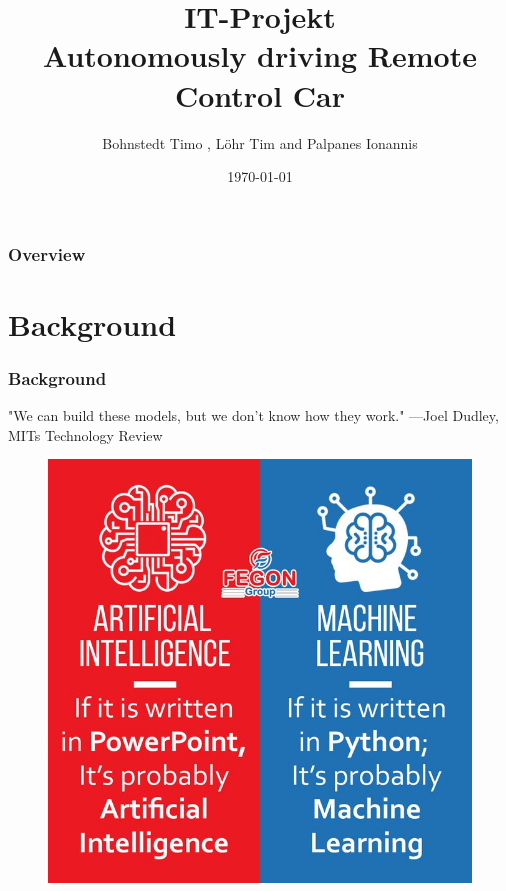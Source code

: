\documentclass{beamer}
\title{IT-Projekt \\ Autonomously driving Remote Control Car} %
\author{Bohnstedt Timo ,
      L\"ohr Tim and Palpanes Ionannis\\%
      }
\institute[Computer Science| Prof. Dr. Florian Gallwitz] %
{
Georg Simon Ohm University of Applied Science\\ %
\medskip
\textit{IT Project Presentation} 
}
\date{\today} %
\begin{document}
\begin{frame}
\titlepage %
\end{frame}
\begin{frame}
\frametitle{Overview} %
\tableofcontents %
\end{frame}
%
\section{Background}
%
\begin{frame}
\frametitle{Background}
\begin{center}
"We can build these models, but we don't know how they work."  \textup{---Joel Dudley}, MITs Technology Review
\end{center}
\begin{figure}
\includegraphics[width=0.4\linewidth]{photo/aivsml}
\end{figure}
\end{frame}
%
\end{document}
